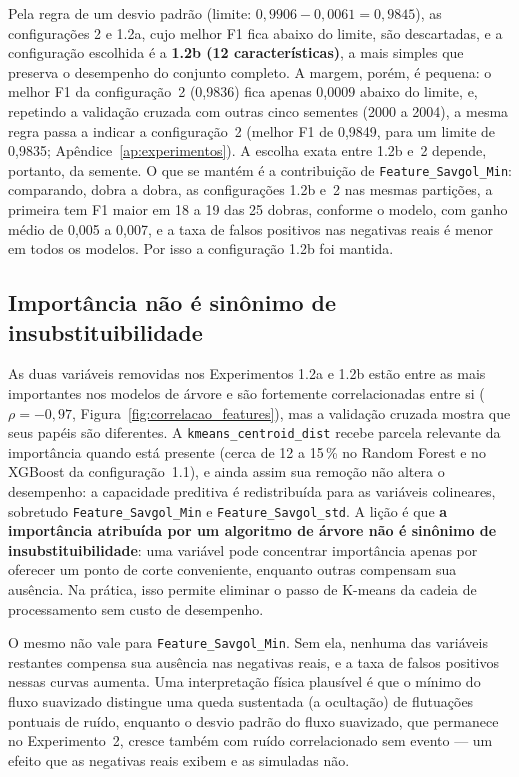 Pela regra de um desvio padrão (limite: $0{,}9906 - 0{,}0061 = 0{,}9845$), as configurações 2 e 1.2a, cujo melhor F1 fica abaixo do limite, são descartadas, e a configuração escolhida é a \textbf{1.2b (12 características)}, a mais simples que preserva o desempenho do conjunto completo. A margem, porém, é pequena: o melhor F1 da configuração~2 (0,9836) fica apenas 0,0009 abaixo do limite, e, repetindo a validação cruzada com outras cinco sementes (2000 a 2004), a mesma regra passa a indicar a configuração~2 (melhor F1 de 0,9849, para um limite de 0,9835; Apêndice~\ref{ap:experimentos}). A escolha exata entre 1.2b e~2 depende, portanto, da semente. O que se mantém é a contribuição de \texttt{Feature\_Savgol\_Min}: comparando, dobra a dobra, as configurações 1.2b e~2 nas mesmas partições, a primeira tem F1 maior em 18 a 19 das 25 dobras, conforme o modelo, com ganho médio de 0,005 a 0,007, e a taxa de falsos positivos nas negativas reais é menor em todos os modelos. Por isso a configuração 1.2b foi mantida.

\subsection{Importância não é sinônimo de insubstituibilidade}
\label{sec:ablation_kmeans}

As duas variáveis removidas nos Experimentos 1.2a e 1.2b estão entre as mais importantes nos modelos de árvore e são fortemente correlacionadas entre si ($\rho = -0{,}97$, Figura~\ref{fig:correlacao_features}), mas a validação cruzada mostra que seus papéis são diferentes. A \texttt{kmeans\_centroid\_dist} recebe parcela relevante da importância quando está presente (cerca de 12 a 15\,\% no Random Forest e no XGBoost da configuração~1.1), e ainda assim sua remoção não altera o desempenho: a capacidade preditiva é redistribuída para as variáveis colineares, sobretudo \texttt{Feature\_Savgol\_Min} e \texttt{Feature\_Savgol\_std}. A lição é que \textbf{a importância atribuída por um algoritmo de árvore não é sinônimo de insubstituibilidade}: uma variável pode concentrar importância apenas por oferecer um ponto de corte conveniente, enquanto outras compensam sua ausência. Na prática, isso permite eliminar o passo de K-means da cadeia de processamento sem custo de desempenho.

O mesmo não vale para \texttt{Feature\_Savgol\_Min}. Sem ela, nenhuma das variáveis restantes compensa sua ausência nas negativas reais, e a taxa de falsos positivos nessas curvas aumenta. Uma interpretação física plausível é que o mínimo do fluxo suavizado distingue uma queda sustentada (a ocultação) de flutuações pontuais de ruído, enquanto o desvio padrão do fluxo suavizado, que permanece no Experimento~2, cresce também com ruído correlacionado sem evento --- um efeito que as negativas reais exibem e as simuladas não.

